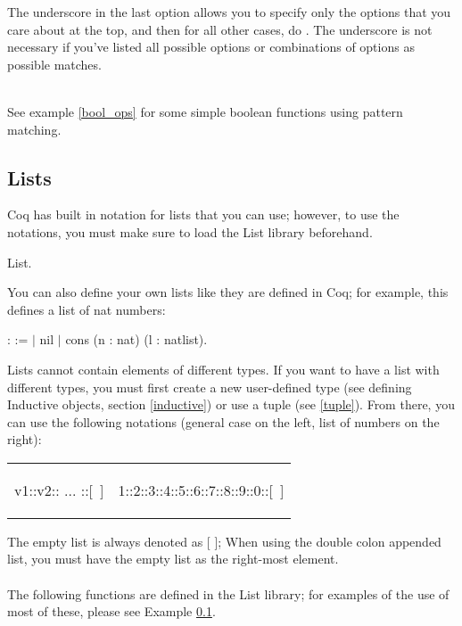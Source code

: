 \noindent
The underscore in the last option allows you to specify only the options that you care about at the top, and then for all other cases, do . The underscore is not necessary if you've listed all possible options or combinations of options as possible matches.

~\\ \noindent
See example \ref{bool_ops} for some simple boolean functions using pattern matching.





\subsection{Lists} \label{list} 
Coq has built in notation for lists that you can use; however, to use the notations, you must make sure to load the List library beforehand. 
\begin{code}
	\Load List.
\end{code}

\noindent
You can also define your own lists like they are defined in Coq; for example, this defines a list of nat numbers:
\begin{code}
\Inductive {} : \Type :=
  $\mid$ nil
  $\mid$ cons (n : nat) (l : natlist).
\end{code}


\noindent
Lists cannot contain elements of different types. 
If you want to have a list with different types, you must first create a new user-defined type (see defining Inductive objects, section \ref{inductive}) or use a tuple (see \ref{tuple}).
From there, you can use the following notations (general case on the left, list of numbers on the right):
\hspace{-1cm}
\begin{tabular}{p{8cm} p{8cm}}
\begin{code}
	v1::v2:: ... ::[\ ]
\end{code}
\begin{code}
	[ v1; ...; vN ]
\end{code}
&
\begin{code}
	1::2::3::4::5::6::7::8::9::0::[\ ]
\end{code}
\begin{code}
	[ 1; 2; 3; 4; 5; 6; 7; 8; 9; 0 ]
\end{code} 
\end{tabular}
The empty list is always denoted as [ ]; When using the double colon appended list, you must have the empty list as the right-most element.
\\ \\
\noindent
The following functions are defined in the List library; for examples of the use of most of these, please see Example \ref{list}.

